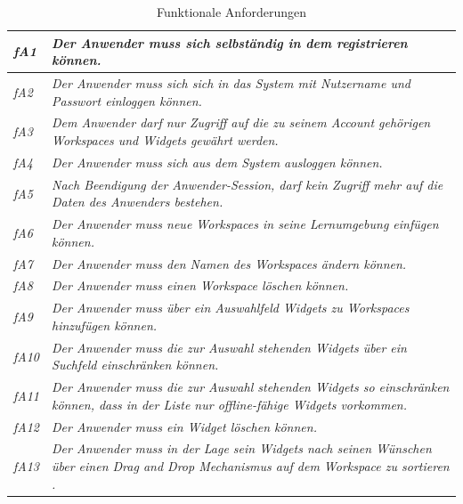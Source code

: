 \renewcommand{\arraystretch}{1.4} 
\begin{table}[ht]
\caption{Funktionale Anforderungen}
\begin{tabularx}{\textwidth}{ l | X }
\emph{fA1} & \emph{Der Anwender muss sich selbständig in dem registrieren können.} \\ \hline
\emph{fA2} & \emph{Der Anwender muss sich sich in das System mit Nutzername und Passwort einloggen können.} \\ \hline
\emph{fA3} & \emph{Dem Anwender darf nur Zugriff auf die zu seinem Account gehörigen Workspaces und Widgets gewährt werden.} \\ \hline
\emph{fA4} & \emph{Der Anwender muss sich aus dem System ausloggen können.} \\ \hline
\emph{fA5} & \emph{Nach Beendigung der Anwender-Session, darf kein Zugriff mehr auf die Daten des Anwenders bestehen.} \\ \hline
\emph{fA6} & \emph{Der Anwender muss neue Workspaces in seine Lernumgebung einfügen können.} \\ \hline
\emph{fA7} & \emph{Der Anwender muss den Namen des Workspaces ändern können.} \\ \hline
\emph{fA8} & \emph{Der Anwender muss einen Workspace löschen können.} \\ \hline
\emph{fA9} & \emph{Der Anwender muss über ein Auswahlfeld Widgets zu Workspaces hinzufügen können.} \\ \hline
\emph{fA10} & \emph{Der Anwender muss die zur Auswahl stehenden Widgets über ein Suchfeld einschränken können.} \\ \hline
\emph{fA11} & \emph{Der Anwender muss die zur Auswahl stehenden Widgets so einschränken können, dass in der Liste nur offline-fähige Widgets vorkommen.} \\ \hline
\emph{fA12} & \emph{Der Anwender muss ein Widget löschen können.} \\\hline
\emph{fA13} & \emph{Der Anwender muss in der Lage sein Widgets nach seinen Wünschen über einen Drag and Drop Mechanismus auf dem Workspace zu sortieren .} \\ \hline
\end{tabularx}
\label{table:funktionale_anforderungen}
\end{table}

